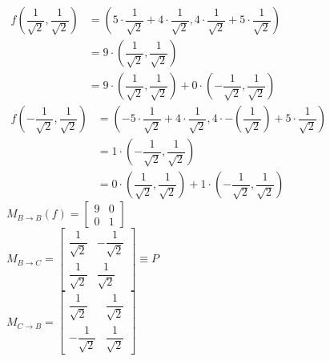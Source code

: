 $\begin{aligned}
		f\left(\dfrac{1}{\sqrt{2}},\dfrac{1}{\sqrt{2}}\right)&=\left(5\cdot\dfrac{1}{\sqrt{2}}+4\cdot\dfrac{1}{\sqrt{2}},4\cdot\dfrac{1}{\sqrt{2}}+5\cdot\dfrac{1}{\sqrt{2}}\right)\\
		&=9\cdot\left(\dfrac{1}{\sqrt{2}},\dfrac{1}{\sqrt{2}}\right)\\
		&=9\cdot\left(\dfrac{1}{\sqrt{2}},\dfrac{1}{\sqrt{2}}\right)+0\cdot\left(-\dfrac{1}{\sqrt{2}},\dfrac{1}{\sqrt{2}}\right)
	\end{aligned}$\\
	$\begin{aligned}
		f\left(-\dfrac{1}{\sqrt{2}},\dfrac{1}{\sqrt{2}}\right)&=\left(-5\cdot\dfrac{1}{\sqrt{2}}+4\cdot\dfrac{1}{\sqrt{2}},4\cdot-\left(\dfrac{1}{\sqrt{2}}\right)+5\cdot\dfrac{1}{\sqrt{2}}\right)\\
		&=1\cdot\left(-\dfrac{1}{\sqrt{2}},\dfrac{1}{\sqrt{2}}\right)\\
		&=0\cdot\left(\dfrac{1}{\sqrt{2}},\dfrac{1}{\sqrt{2}}\right)+1\cdot\left(-\dfrac{1}{\sqrt{2}},\dfrac{1}{\sqrt{2}}\right)
	\end{aligned}$\\
	$M_{B\to B}(f)=\begin{bmatrix}
		9 & 0\\
		0 & 1
	\end{bmatrix}$\\
	$M_{B\to C}=\begin{bmatrix}
		\dfrac{1}{\sqrt{2}} & -\dfrac{1}{\sqrt{2}}\\
		\dfrac{1}{\sqrt{2}} & \dfrac{1}{\sqrt{2}}
	\end{bmatrix}\equiv P$\\
	$M_{C\to B}=\begin{bmatrix}
		\dfrac{1}{\sqrt{2}} & \dfrac{1}{\sqrt{2}}\\
		-\dfrac{1}{\sqrt{2}} & \dfrac{1}{\sqrt{2}}
	\end{bmatrix}$
